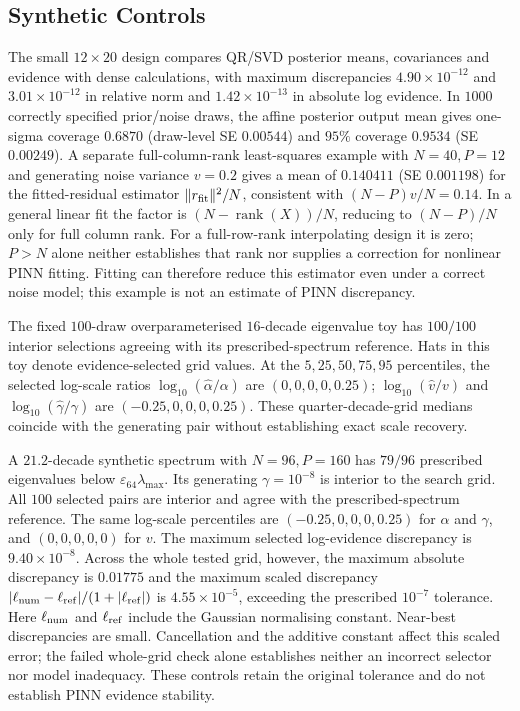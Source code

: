 \subsection{Synthetic Controls}\label{app:evidence-toys}
The small $12\times20$ design compares QR/SVD posterior means, covariances and evidence
with dense calculations, with maximum discrepancies $4.90\times10^{-12}$ and
$3.01\times10^{-12}$ in relative norm and $1.42\times10^{-13}$ in absolute log evidence.
In $1000$ correctly specified prior/noise draws, the affine posterior output mean gives
one-sigma coverage $0.6870$ (draw-level SE $0.00544$) and $95\%$ coverage $0.9534$
(SE $0.00249$). A separate full-column-rank least-squares example with $N=40,P=12$
and generating noise variance $v=0.2$ gives a mean of $0.140411$ (SE $0.001198$)
for the fitted-residual estimator $\|r_{\rm fit}\|^2/N$, consistent with
$(N-P)v/N=0.14$. In a general linear fit the factor is
$(N-\operatorname{rank}(X))/N$, reducing to $(N-P)/N$ only for full column rank.
For a full-row-rank interpolating design it is zero; $P>N$ alone neither establishes
that rank nor supplies a correction for nonlinear PINN fitting.
Fitting can therefore reduce this estimator even under a correct
noise model; this example is not an estimate of PINN discrepancy.

The fixed $100$-draw overparameterised $16$-decade eigenvalue toy has
$100/100$ interior selections agreeing with its prescribed-spectrum reference.
Hats in this toy denote evidence-selected grid values.
At the $5,25,50,75,95$ percentiles, the selected log-scale ratios
$\log_{10}(\widehat\alpha/\alpha)$ are $(0,0,0,0,0.25)$;
$\log_{10}(\widehat v/v)$ and $\log_{10}(\widehat\gamma/\gamma)$ are
$(-0.25,0,0,0,0.25)$. These quarter-decade-grid medians coincide with the generating
pair without establishing exact scale recovery.

A $21.2$-decade synthetic spectrum with $N=96,P=160$ has $79/96$ prescribed
eigenvalues below $\varepsilon_{64}\lambda_{\max}$. Its generating
$\gamma=10^{-8}$ is interior to the search grid. All $100$ selected pairs are
interior and agree with the prescribed-spectrum reference. The same log-scale
percentiles are $(-0.25,0,0,0,0.25)$ for $\alpha$ and $\gamma$, and
$(0,0,0,0,0)$ for $v$. The maximum selected log-evidence discrepancy is
$9.40\times10^{-8}$. Across the whole tested grid, however, the maximum absolute
discrepancy is $0.01775$ and the maximum scaled discrepancy
$|\ell_{\rm num}-\ell_{\rm ref}|/(1+|\ell_{\rm ref}|)$ is $4.55\times10^{-5}$,
exceeding the prescribed $10^{-7}$ tolerance. Here $\ell_{\rm num}$ and
$\ell_{\rm ref}$ include the Gaussian normalising constant. Near-best discrepancies are
small. Cancellation and the additive constant affect this scaled error; the failed
whole-grid check alone establishes neither an incorrect selector nor model inadequacy.
These controls retain the original tolerance and do not establish PINN evidence stability.
